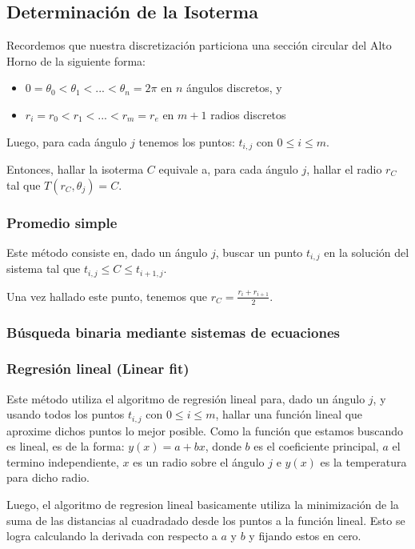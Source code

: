 \subsection{Determinación de la Isoterma}

Recordemos que nuestra discretización particiona una sección circular del Alto Horno de la siguiente forma:
 \begin{itemize}
 	\item $0 = \theta_0 < \theta_1 < ... < \theta_n = 2\pi$ en $n$ \'angulos discretos, y
 	\item $r_i = r_0 < r_1 < ... < r_m = r_e$ en $m+1$ radios discretos
 \end{itemize}

Luego, para cada ángulo $j$ tenemos los puntos: $t_{i,j}$ con $0 \leq i \leq m$.

Entonces, hallar la isoterma $C$ equivale a, para cada ángulo $j$, hallar el radio $r_C$ tal que $T(r_C, \theta_j) = C$.

\subsubsection{Promedio simple}

Este método consiste en, dado un ángulo $j$, buscar un punto $t_{i,j}$ en la solución del sistema tal que $t_{i,j} \leq C \leq t_{i+1,j}$.

Una vez hallado este punto, tenemos que $r_C = \frac{r_i + r_{i+1}}{2}$.

\subsubsection{Búsqueda binaria mediante sistemas de ecuaciones}



\subsubsection{Regresión lineal (Linear fit)}

Este método utiliza el algoritmo de regresión lineal para, dado un ángulo $j$, y usando todos los puntos $t_{i,j}$ con $0 \leq i \leq m$, hallar una función lineal que aproxime dichos puntos lo mejor posible.
Como la función que estamos buscando es lineal, es de la forma: $y(x) = a + bx$, donde $b$ es el coeficiente principal, $a$ el termino independiente, $x$ es un radio sobre el ángulo $j$ e $y(x)$ es la temperatura para dicho radio.

Luego, el algoritmo de regresion lineal basicamente utiliza la minimización de la suma de las distancias al cuadradado desde los puntos a la función lineal. Esto se logra calculando la derivada con respecto a $a$ y $b$ y fijando estos en cero.


